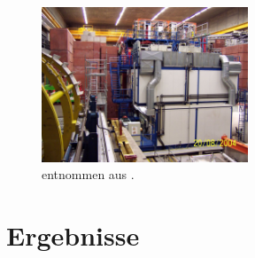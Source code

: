 \documentclass[aspectratio=1610, 9pt]{beamer}
\begin{document}
\begin{frame}
  \begin{figure}
    \centering
    \includegraphics[width=0.55\textwidth]{images/H1_detector.jpg}
    \caption{entnommen aus \cite{Wiki-H1}.}
  \end{figure}
\end{frame}


\section{Ergebnisse}
\end{document}
